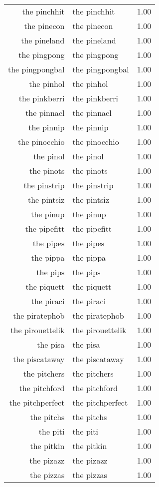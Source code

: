 \begin{table}[ht]
\begin{tabular}{rlr}
  the pinchhit & the pinchhit & 1.00 \\ 
  the pinecon & the pinecon & 1.00 \\ 
  the pineland & the pineland & 1.00 \\ 
  the pingpong & the pingpong & 1.00 \\ 
  the pingpongbal & the pingpongbal & 1.00 \\ 
  the pinhol & the pinhol & 1.00 \\ 
  the pinkberri & the pinkberri & 1.00 \\ 
  the pinnacl & the pinnacl & 1.00 \\ 
  the pinnip & the pinnip & 1.00 \\ 
  the pinocchio & the pinocchio & 1.00 \\ 
  the pinol & the pinol & 1.00 \\ 
  the pinots & the pinots & 1.00 \\ 
  the pinstrip & the pinstrip & 1.00 \\ 
  the pintsiz & the pintsiz & 1.00 \\ 
  the pinup & the pinup & 1.00 \\ 
  the pipefitt & the pipefitt & 1.00 \\ 
  the pipes & the pipes & 1.00 \\ 
  the pippa & the pippa & 1.00 \\ 
  the pips & the pips & 1.00 \\ 
  the piquett & the piquett & 1.00 \\ 
  the piraci & the piraci & 1.00 \\ 
  the piratephob & the piratephob & 1.00 \\ 
  the pirouettelik & the pirouettelik & 1.00 \\ 
  the pisa & the pisa & 1.00 \\ 
  the piscataway & the piscataway & 1.00 \\ 
  the pitchers & the pitchers & 1.00 \\ 
  the pitchford & the pitchford & 1.00 \\ 
  the pitchperfect & the pitchperfect & 1.00 \\ 
  the pitchs & the pitchs & 1.00 \\ 
  the piti & the piti & 1.00 \\ 
  the pitkin & the pitkin & 1.00 \\ 
  the pizazz & the pizazz & 1.00 \\ 
  the pizzas & the pizzas & 1.00 \\ 

\end{tabular}
\end{table}

